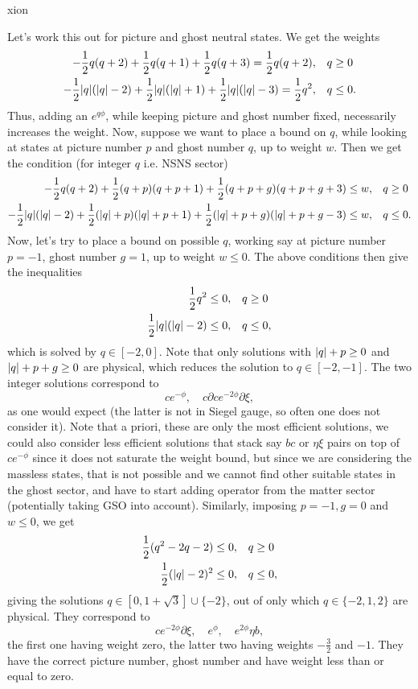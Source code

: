xion\documentclass[12pt]{article}
\def\be{\begin{equation}}
\def\ee{\end{equation}}
\numberwithin{equation}{section}
\begin{document}
Let's work this out for picture and ghost neutral states. We get the weights
\be
\begin{aligned}
-\frac{1}{2} q(q+2) + \frac{1}{2} q(q+1) + \frac{1}{2} q(q+3) = \frac{1}{2} q(q+2), \quad &q \geq 0 \\
	-\frac{1}{2} \abs{q}(\abs{q} - 2) + \frac{1}{2} \abs{q} (\abs{q} + 1) + \frac{1}{2} \abs{q}(\abs{q}-3) = \frac{1}{2} q^2, \quad & q \leq 0.
\end{aligned}
\ee
Thus, adding an $e^{q\phi}$, while keeping picture and ghost number fixed, necessarily increases the weight. Now, suppose we want to place a bound on $q$, while looking at states at picture number $p$ and ghost number $q$, up to weight $w$. Then we get the condition (for integer $q$ i.e. NSNS sector)
\be
\begin{aligned}
-\frac{1}{2} q(q+2) + \frac{1}{2} (q+p)(q + p +1) + \frac{1}{2} (q+p+g)(q+p+g+3) \leq w, \quad &q \geq 0 \\
	-\frac{1}{2} \abs{q}(\abs{q} - 2) + \frac{1}{2} (\abs{q} + p) (\abs{q} + p + 1) + \frac{1}{2} (\abs{q} + p + g)(\abs{q}+p + g -3) \leq w, \quad & q \leq 0.
\end{aligned}
\ee
Now, let's try to place a bound on possible $q$, working say at picture number $p = -1$, ghost number $g = 1$, up to weight $w \leq 0$. The above conditions then give the inequalities
\be
\begin{aligned}
	\frac{1}{2} q^2 \leq 0, \quad &q \geq 0 \\
	\frac{1}{2} \abs{q}(\abs{q}-2) \leq 0, \quad & q \leq 0,
\end{aligned}
\ee
which is solved by $q \in [-2, 0]$. Note that only solutions with $\abs{q} + p \geq 0$ and $\abs{q} + p + g \geq 0$ are physical, which reduces the solution to $q \in [-2, -1]$. The two integer solutions correspond to
\be
c e^{-\phi}, \quad c\partial c e^{-2\phi} \partial \xi,
\ee
as one would expect (the latter is not in Siegel gauge, so often one does not consider it). Note that a priori, these are only the most efficient solutions, we could also consider less efficient solutions that stack say $bc$ or $\eta\xi$ pairs on top of $c e^{-\phi}$ since it does not saturate the weight bound, but since we are considering the massless states, that is not possible and we cannot find other suitable states in the ghost sector, and have to start adding operator from the matter sector (potentially taking GSO into account). Similarly, imposing $p = -1, g = 0$ and $w \leq 0$, we get
\be
\begin{aligned}
\frac{1}{2} (q^2 - 2q - 2) \leq 0, \quad &q \geq 0 \\
\frac{1}{2} (\abs{q}-2)^2 \leq 0, \quad & q \leq 0,
\end{aligned}
\ee
giving the solutions $q \in [0, 1 + \sqrt{3}] \cup \{-2\}$, out of only which $q \in \{-2, 1, 2\}$ are physical. They correspond to
\be
c e^{-2\phi} \partial \xi, \quad e^{\phi}, \quad e^{2\phi} \eta b,
\ee
the first one having weight zero, the latter two having weights $-\frac{3}{2}$ and $-1$. They have the correct picture number, ghost number and have weight less than or equal to zero.
\end{document}

